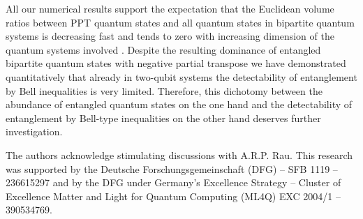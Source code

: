 \documentclass[12pt]{iopart}
\begin{document}
All our numerical results support the expectation that
the Euclidean volume ratios between PPT quantum states and all quantum states in bipartite quantum systems is decreasing fast and tends to zero with increasing dimension of the quantum systems involved \cite{infinite}. 
Despite the resulting dominance of entangled bipartite quantum states   with negative partial transpose we have demonstrated quantitatively that already in two-qubit systems the detectability of entanglement 
by Bell inequalities is very limited. Therefore, this dichotomy between the abundance of entangled quantum states on the one hand and the detectability of entanglement by Bell-type inequalities on the other hand deserves further investigation.

\ack
The authors acknowledge stimulating discussions with A.R.P. Rau. This research was supported by the Deutsche 
Forschungsgemeinschaft (DFG) -- SFB 1119 -- 236615297 and by the 
DFG 
under Germany's Excellence Strategy -- Cluster of Excellence Matter and Light for Quantum Computing (ML4Q) EXC 2004/1 -- 390534769.
\end{document}
